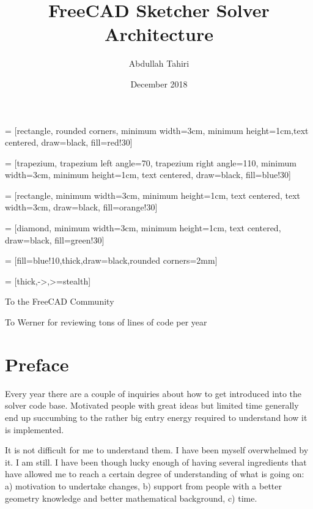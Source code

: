 \documentclass[12pt,twoside,a4paper]{book}
\title{FreeCAD Sketcher Solver Architecture}
\author{Abdullah Tahiri}
\date{December 2018}
\newenvironment{dedication}
  {\clearpage           %
   \thispagestyle{empty}%
   \vspace*{\stretch{1}}%
   \itshape             %
   \raggedleft          %
  }
  {\par %
   \vspace{\stretch{3}} %
   \clearpage           %
  }
\begin{document}
     = [rectangle, rounded corners, minimum width=3cm, minimum height=1cm,text centered, draw=black, fill=red!30]

     = [trapezium, trapezium left angle=70, trapezium right angle=110, minimum width=3cm, minimum height=1cm, text centered, draw=black, fill=blue!30]


     = [rectangle, minimum width=3cm, minimum height=1cm, text centered, text width=3cm, draw=black, fill=orange!30]

     = [diamond, minimum width=3cm, minimum height=1cm, text centered, draw=black, fill=green!30]

     = [fill=blue!10,thick,draw=black,rounded corners=2mm]

     = [thick,->,>=stealth]

    \frontmatter

    \maketitle

    \begin{dedication}
        To the FreeCAD Community
        \par   %
        \vspace{2\baselineskip}
        To Werner for reviewing tons of lines of code per year
    \end{dedication}


    \chapter{Preface}

    Every year there are a couple of inquiries about how to get introduced into the solver code base. Motivated people with great ideas but limited time generally end up succumbing to the rather big entry energy required to understand how it is implemented.

    It is not difficult for me to understand them. I have been myself overwhelmed by it. I am still. I have been though lucky enough of having several ingredients that have allowed me to reach a certain degree of understanding of what is going on: a) motivation to undertake changes, b) support from people with a better geometry knowledge and better mathematical background, c) time.
\end{document}
